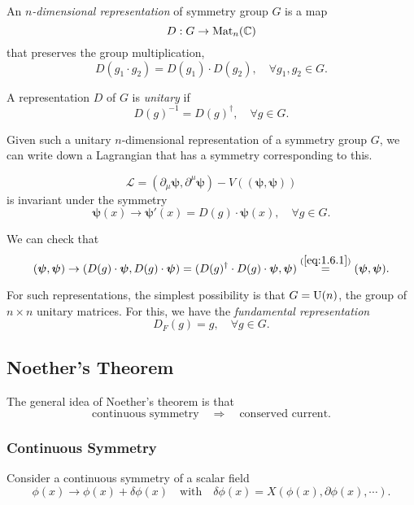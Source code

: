 \documentclass[a4paper,11pt]{article}
\begin{document}
	\begin{defi}
		An \emph{$n$-dimensional representation} of symmetry group $G$ is a map
		\[
			D : G \to \operatorname{Mat}_n(\mathbb{C})
		\]
		that preserves the group multiplication,
		\[
			D(g_1 \cdot g_2) = D(g_1)\cdot D(g_2), \quad \forall g_1, g_2 \in G.
		\]

		A representation $D$ of $G$ is \emph{unitary} if
		\begin{equation}
			D(g)^{-1} = D(g)^\dagger, \quad \forall g \in G.
			\label{eq:1.6.1}
		\end{equation}
	\end{defi}

	Given such a unitary $n$-dimensional representation of a symmetry group $G$, we can write down a Lagrangian that has a symmetry corresponding to this.

	\begin{equation*}
		\mathcal{L} = (\partial_\mu \bm \psi, \partial^\mu \bm \psi) - V((\bm \psi, \bm \psi))
	\end{equation*}
	is invariant under the symmetry
	\begin{equation*}
		\bm \psi (x) \to \bm \psi'(x) = D(g) \cdot \bm \psi(x), \quad \forall g \in G.
	\end{equation*}

	We can check that
	\[
		(\bm \psi, \bm \psi) \to (D(g) \cdot \bm \psi, D(g) \cdot \bm \psi) = (D(g)^\dagger \cdot D(g) \cdot \bm \psi, \bm \psi) \overset{(\ref{eq:1.6.1})}{=} (\bm \psi,\bm \psi).
	\]
	
	For such representations, the simplest possibility is that $G = \operatorname{U}(n)$, the group of $n \times n$ unitary matrices. For this, we have the \emph{fundamental representation}
	\[
		D_F(g) = g, \quad \forall g \in G.
	\]
	
	\subsection{Noether's Theorem}

	The general idea of Noether's theorem is that
	\[
		\text{continuous symmetry} \quad \Rightarrow \quad \text{conserved current}.
	\]

	\subsubsection{Continuous Symmetry}

	Consider a continuous symmetry of a scalar field
	\[
		\phi(x) \to \phi(x) + \delta \phi(x) \quad \text{with} \quad \delta \phi(x) = X(\phi(x), \partial \phi(x), \cdots).
	\]
	
\end{document}
